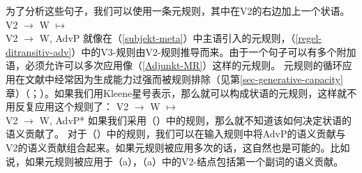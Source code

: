 \noindent
为了分析这些句子，我们可以使用一条元规则，其中在V2的右边加上一个状语\citep[]{Uszkoreit87a}。
\ea
\label{Adjunkt-MR}
V2  $\to$ W $\mapsto$\\
V2  $\to$ W, AdvP
\z 
就像在（\ref{subjekt-meta}）中主语引入的元规则，（\ref{regel-ditransitiv-adv}）中的V3-规则由V2-规则推导而来。由于一个句子可以有多个附加语，必须允许可以多次应用像（\ref{Adjunkt-MR}）这样的元规则。
元规则的循环应用在文献中经常因为生成能力过强而被规则排除（见第\ref{sec-generative-capacity}章）（\citealp{Thompson82a-u}；\citealp[]{Uszkoreit87a}）。如果我们用Kleene星号\isce{*}{*}表示，那么就可以构成状语的元规则，这样就不用反复应用这个规则了\citep[]{Uszkoreit87a}：
\ea
\label{adv-metarule}
V2  $\to$ W $\mapsto$\\
V2  $\to$ W, AdvP*
\z 
如果我们采用（）中的规则，那么就不知道该如何决定状语的语义贡献了。 对于（）中的规则，我们可以在输入规则中将AdvP的语义贡献与V2的语义贡献组合起来。如果元规则被应用多次的话，这自然也是可能的。比如说，如果元规则被应用于（a），（a）中的V2-结点包括第一个副词的语义贡献。
